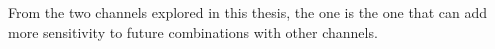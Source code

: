 From the two channels explored in this thesis, the \dilepSStau one is the 
one that can add more sensitivity to future combinations with other
\tHq channels. 

		

